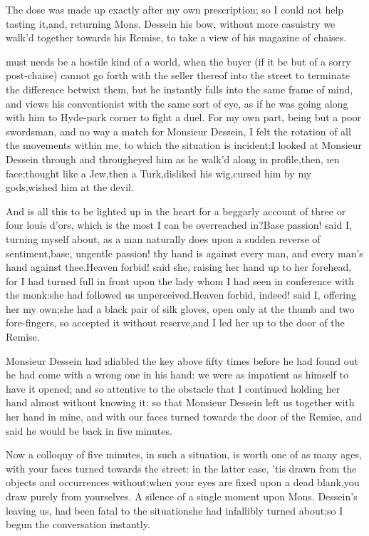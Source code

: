 \documentclass[twoside]{article}
\begin{document}
The dose was made up exactly after my own prescription; so I could not
help tasting it,\tsk and, returning Mons. Dessein his bow, without more
casuistry we walk’d together towards his Remise, to take a view of his
magazine of chaises.






 must needs be a hostile kind of a world, when the buyer (if it be but
of a sorry post-chaise) cannot go forth with the seller thereof into the
street to terminate the difference betwixt them, but he instantly falls
into the same frame of mind, and views his conventionist with the same
sort of eye, as if he was going along with him to Hyde-park corner to
fight a duel.  For my own part, being but a poor swordsman, and no way a
match for Monsieur Dessein, I felt the rotation of all the movements
within me, to which the situation is incident;\tsk I looked at Monsieur
Dessein through and through\tsk eyed him as he walk’d along in profile,\tsk then,
\i{en face};\tsk thought like a Jew,\tsk then a Turk,\tsk disliked his wig,\tsk cursed him
by my gods,\tsk wished him at the devil.\tsk 

\tsk And is all this to be lighted up in the heart for a beggarly account of
three or four louis d’ors, which is the most I can be overreached
in?\tsk Base passion! said I, turning myself about, as a man naturally does
upon a sudden reverse of sentiment,\tsk base, ungentle passion! thy hand is
against every man, and every man’s hand against thee.\tsk Heaven forbid! said
she, raising her hand up to her forehead, for I had turned full in front
upon the lady whom I had seen in conference with the monk:\tsk she had
followed us unperceived.\tsk Heaven forbid, indeed! said I, offering her my
own;\tsk she had a black pair of silk gloves, open only at the thumb and two
fore-fingers, so accepted it without reserve,\tsk and I led her up to the
door of the Remise.

Monsieur Dessein had \i{diabled} the key above fifty times before he had
found out he had come with a wrong one in his hand: we were as impatient
as himself to have it opened; and so attentive to the obstacle that I
continued holding her hand almost without knowing it: so that Monsieur
Dessein left us together with her hand in mine, and with our faces turned
towards the door of the Remise, and said he would be back in five
minutes.

Now a colloquy of five minutes, in such a situation, is worth one of as
many ages, with your faces turned towards the street: in the latter case,
’tis drawn from the objects and occurrences without;\tsk when your eyes are
fixed upon a dead blank,\tsk you draw purely from yourselves.  A silence of a
single moment upon Mons. Dessein’s leaving us, had been fatal to the
situation\tsk she had infallibly turned about;\tsk so I begun the conversation
instantly.\tsk 
\end{document}
